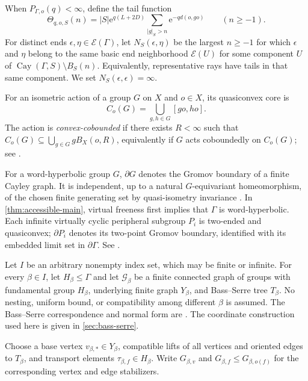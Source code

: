 \documentclass[11pt]{article}
\theoremstyle{definition}
\newcommand{\Cay}{\operatorname{Cay}}
\newcommand{\e}{\mathrm e}
\begin{document}
When $P_{\Gamma,o}(q)<\infty$, define the tail function
\[
 \Theta_{q,o,S}(n)=|S|\e^{q(L+2D)}
 \sum_{|g|_S>n}\e^{-q d(o,go)}\qquad(n\ge-1).
\]
For distinct ends $\epsilon,\eta\in\mathcal E(\Gamma)$, let
$N_S(\epsilon,\eta)$ be the largest $n\ge-1$ for which $\epsilon$ and $\eta$ belong to the
same basic end neighborhood $\mathcal E(U)$ for some component
$U$ of $\Cay(\Gamma,S)\setminus B_S(n)$. Equivalently, representative rays have tails in
that same component.  We set $N_S(\epsilon,\epsilon)=\infty$.

For an isometric action of a group $G$ on $X$ and $o\in X$, its quasiconvex core is
\[
 C_o(G)=\bigcup_{g,h\in G}[go,ho].
\]
The action is \emph{convex-cobounded} if there exists $R<\infty$ such that
$C_o(G)\subseteq\bigcup_{g\in G}gB_X(o,R)$, equivalently if $G$ acts coboundedly on
$C_o(G)$; see
\cite[Proposition~7.5.3 and Definition~12.2.5]{DasSimmonsUrbanski2017}.

For a word-hyperbolic group $G$, $\partial G$ denotes the Gromov boundary of a finite Cayley
graph.  It is independent, up to a natural $G$-equivariant homeomorphism, of the chosen finite
generating set by quasi-isometry invariance
\cite[Chapter~III.H, Theorem~3.9]{BridsonHaefliger1999}.  In
\cref{thm:accessible-main}, virtual freeness first implies that $\Gamma$ is
word-hyperbolic.  Each infinite virtually cyclic peripheral subgroup $P_i$ is two-ended and
quasiconvex; $\partial P_i$ denotes its two-point Gromov boundary, identified with its embedded
limit set in $\partial\Gamma$.  See
\cite[Chapter~III.$\Gamma$, Lemma~3.5 and Proposition~3.7; Chapter~III.H,
Theorem~3.9]{BridsonHaefliger1999}.

Let $I$ be an arbitrary nonempty index set, which may be finite or infinite.  For every
$\beta\in I$, let $H_\beta\le\Gamma$ and let $\mathcal G_\beta$ be a finite connected graph
of groups with fundamental group $H_\beta$, underlying finite graph $Y_\beta$, and
Bass--Serre tree $T_\beta$.  No nesting, uniform bound, or compatibility among different
$\beta$ is assumed.  The Bass--Serre correspondence and normal form are
\cite[Chapter~I, Section~5.4, Theorem~13]{Serre2003}. The coordinate construction
used here is given in \cref{sec:bass-serre}.

Choose a base vertex $v_{\beta,*}\in Y_\beta$, compatible lifts of all vertices and oriented
edges to $T_\beta$, and transport elements $\tau_{\beta,f}\in H_\beta$.  Write
$G_{\beta,v}$ and $G_{\beta,f}\le G_{\beta,o(f)}$ for the corresponding vertex and edge
stabilizers.  
\end{document}
